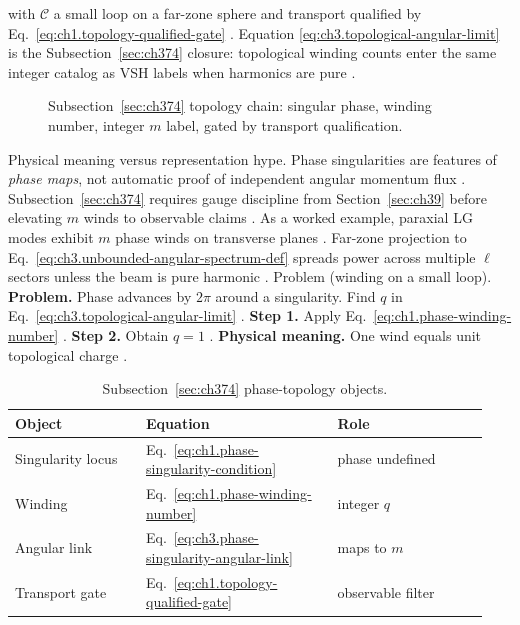 with \(\mathcal{C}\) a small loop on a far-zone sphere and transport qualified by
Eq.~\eqref{eq:ch1.topology-qualified-gate} \cite{stratton1941}. Equation
\eqref{eq:ch3.topological-angular-limit} is the Subsection~\ref{sec:ch374} closure: topological winding counts enter the
same integer catalog as VSH labels when harmonics are pure \cite{hansen1988}.
\begin{figure}[t]
\centering
{}
\caption{Subsection~\ref{sec:ch374} topology chain: singular phase, winding number, integer \(m\) label, gated by transport
qualification.}
\label{fig:ch3.374-topology-chain}
\end{figure}
Physical meaning versus representation hype. Phase singularities are features of \emph{phase maps}, not automatic proof of independent angular momentum flux
\cite{belinfante1940}. Subsection~\ref{sec:ch374} requires gauge discipline from Section~\ref{sec:ch39}
before elevating \(m\) winds to observable claims \cite{belinfante1940}.
As a worked example, paraxial LG modes exhibit \(m\) phase winds on transverse planes \cite{allen1992}. Far-zone projection to
Eq.~\eqref{eq:ch3.unbounded-angular-spectrum-def} spreads power across multiple \(\ell\) sectors unless the beam is pure
harmonic \cite{harrington2001}.
Problem (winding on a small loop). \textbf{Problem.} Phase advances by \(2\pi\) around a singularity. Find \(q\) in Eq.~\eqref{eq:ch3.topological-angular-limit}
\cite{allen1992}.
\textbf{Step 1.} Apply Eq.~\eqref{eq:ch1.phase-winding-number} \cite{stratton1941}.
\textbf{Step 2.} Obtain \(q=1\) \cite{allen1992}.
\textbf{Physical meaning.} One wind equals unit topological charge \cite{jackson1999}.
\begin{table}[t]
\centering
\caption{Subsection~\ref{sec:ch374} phase-topology objects.}
\label{tab:ch3.374-topology-objects}
\small
\begin{tabular}{@{}p{0.26\linewidth}p{0.38\linewidth}p{0.30\linewidth}@{}}
\toprule
Object & Equation & Role \\
\midrule
Singularity locus & Eq.~\eqref{eq:ch1.phase-singularity-condition} & phase undefined \\
Winding & Eq.~\eqref{eq:ch1.phase-winding-number} & integer \(q\) \\
Angular link & Eq.~\eqref{eq:ch3.phase-singularity-angular-link} & maps to \(m\) \\
Transport gate & Eq.~\eqref{eq:ch1.topology-qualified-gate} & observable filter \\
\bottomrule
\end{tabular}
\end{table}
